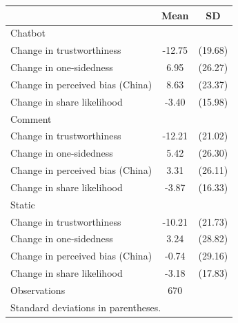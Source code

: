 \begin{tabular}{l*{1}{cc}}
\toprule
                    &        Mean&          SD\\
\midrule
Chatbot             &            &            \\
Change in trustworthiness&      -12.75&     (19.68)\\
Change in one-sidedness&        6.95&     (26.27)\\
Change in perceived bias (China)&        8.63&     (23.37)\\
Change in share likelihood&       -3.40&     (15.98)\\
\midrule
Comment             &            &            \\
Change in trustworthiness&      -12.21&     (21.02)\\
Change in one-sidedness&        5.42&     (26.30)\\
Change in perceived bias (China)&        3.31&     (26.11)\\
Change in share likelihood&       -3.87&     (16.33)\\
\midrule
Static              &            &            \\
Change in trustworthiness&      -10.21&     (21.73)\\
Change in one-sidedness&        3.24&     (28.82)\\
Change in perceived bias (China)&       -0.74&     (29.16)\\
Change in share likelihood&       -3.18&     (17.83)\\
\midrule
Observations        &         670&            \\
\bottomrule
\multicolumn{3}{l}{\footnotesize Standard deviations in parentheses.}\\
\end{tabular}
